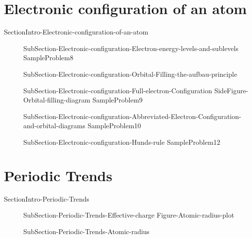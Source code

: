\documentclass[main.tex]{subfiles}
\newcommand\chapterlabel{Ch-Table}\setcounter{figurenewcounter}{0}\setcounter{tablenewcounter}{0}\setcounter{formulanewcounter}{0}\chapterpicture{../{\chapterlabel}/figure1}\chapterpicturelabel{PxFuel}
\begin{document}
{{\section{Electronic configuration of an atom}{SectionIntro-Electronic-configuration-of-an-atom}
\sloppy\begin{description}
\item[] {SubSection-Electronic-configuration-Electron-energy-levels-and-sublevels}
{SampleProblem8}
     \label{Fig:{\chapterlabel}\thefigurenewcounter} 
\item[]{SubSection-Electronic-configuration-Orbital-Filling-the-aufbau-principle}
\item[] {SubSection-Electronic-configuration-Full-electron-Configuration}
{SideFigure-Orbital-filling-diagram}
{SampleProblem9}
\item[] {SubSection-Electronic-configuration-Abbreviated-Electron-Configuration-and-orbital-diagrams}
{SampleProblem10}
\item[] {SubSection-Electronic-configuration-Hunds-rule}
{SampleProblem12}
\end{description}



\section{Periodic Trends}{SectionIntro-Periodic-Trends}
\vspace{0cm}{Figure-Atomic-radius}
\sloppy\begin{description}
\item[] {SubSection-Periodic-Trends-Effective-charge}
{Figure-Atomic-radius-plot}
\item[] {SubSection-Periodic-Trends-Atomic-radius}
\newpage\hspace{10cm}{Table-Ionization-energies}


\end{description}}}
\end{document}
